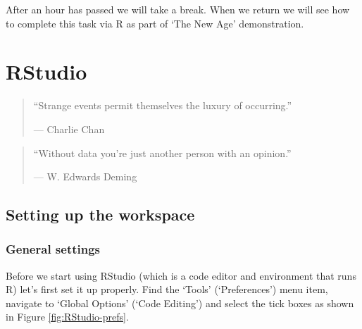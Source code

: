 \documentclass[]{book}
\theoremstyle{definition}
\theoremstyle{definition}
\theoremstyle{definition}
\theoremstyle{remark}
\begin{document}
After an hour has passed we will take a break. When we return we will
see how to complete this task via R as part of `The New Age'
demonstration.

\chapter{RStudio}\label{rstudio}

\begin{quote}
``Strange events permit themselves the luxury of occurring.''

--- Charlie Chan
\end{quote}

\begin{quote}
``Without data you're just another person with an opinion.''

--- W. Edwards Deming
\end{quote}

\section{Setting up the workspace}\label{setting-up-the-workspace}

\subsection{General settings}\label{general-settings}

Before we start using RStudio (which is a code editor and environment
that runs R) let's first set it up properly. Find the `Tools'
(`Preferences') menu item, navigate to `Global Options' (`Code Editing')
and select the tick boxes as shown in Figure \ref{fig:RStudio-prefs}.
\end{document}
